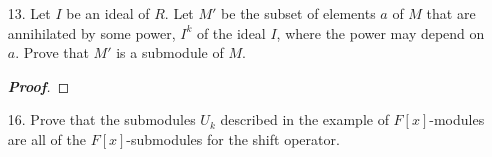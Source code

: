 \documentclass[12pt,leqno]{book}
\theoremstyle{definition}
\newenvironment{Proof}{\begin{proof}[\textnormal{\textbf{Proof}}]}{\end{proof}}
\begin{document}
\begin{enumerate}
\begin{Proof}
\end{Proof}

 \item [13.] Let $I$ be an ideal of $R$. Let $M'$ be the subset of elements $a$ of $M$ that are annihilated by some power, $I^k$ of the ideal $I$, where the power may depend on $a$. Prove that $M'$ is a submodule of $M$.

\begin{Proof}
 
\end{Proof}

 \item [16.] Prove that the submodules $U_k$ described in the example of $F[x]$-modules are all of the $F[x]$-submodules for the shift operator.
\end{enumerate}
\end{document}
